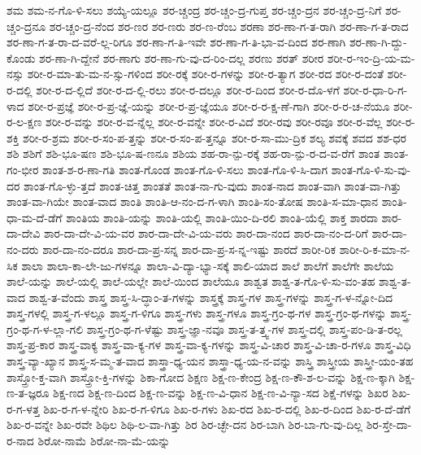 {ಶಮ
ಶಮ-ನ-ಗೊ-ಳಿ-ಸಲು
ಶಯ್ಯೆ-ಯಲ್ಲೂ
ಶರ-ಚ್ಚಂದ್ರ
ಶರ-ಚ್ಚಂ-ದ್ರ-ಗುಪ್ತ
ಶರ-ಚ್ಚಂ-ದ್ರನ
ಶರ-ಚ್ಚಂ-ದ್ರ-ನಿಗೆ
ಶರ-ಚ್ಚಂ-ದ್ರನೂ
ಶರ-ಚ್ಚಂ-ದ್ರ-ನೆಂದ
ಶರ-ಣರ
ಶರ-ಣರು
ಶರ-ಣ-ರೆಂಬ
ಶರಣಾ
ಶರ-ಣಾ-ಗ-ತ-ರಾಗಿ
ಶರ-ಣಾ-ಗ-ತ-ರಾದ
ಶರ-ಣಾ-ಗ-ತ-ರಾ-ದ-ವರೆ-ಲ್ಲ-ರಿಗೂ
ಶರ-ಣಾ-ಗ-ತಿ-ಇವೇ
ಶರ-ಣಾ-ಗ-ತಿ-ಭಾ-ವ-ದಿಂದ
ಶರ-ಣಾಗಿ
ಶರ-ಣಾ-ಗಿ-ದ್ದು-ಕೊಂಡು
ಶರ-ಣಾ-ಗಿ-ದ್ದೇನೆ
ಶರ-ಣಾಗು
ಶರ-ಣಾ-ಗು-ವು-ದ-ರಿಂ-ದಲ್ಲ
ಶರಣು
ಶರತ್
ಶರೀರ
ಶರೀ-ರ-ಇಂ-ದ್ರಿ-ಯ-ಮ-ನಸ್ಸು
ಶರೀ-ರ-ಮಾ-ತು-ಮ-ನ-ಸ್ಸು-ಗಳಿಂದ
ಶರೀ-ರಕ್ಕೆ
ಶರೀ-ರ-ಗಳನ್ನು
ಶರೀ-ರ-ತ್ಯಾಗ
ಶರೀ-ರದ
ಶರೀ-ರ-ದಂತೆ
ಶರೀ-ರ-ದಲ್ಲಿ
ಶರೀ-ರ-ದ-ಲ್ಲಿದೆ
ಶರೀ-ರ-ದ-ಲ್ಲಿ-ರಲು
ಶರೀ-ರ-ದಲ್ಲೂ
ಶರೀ-ರ-ದಿಂದ
ಶರೀ-ರ-ದೊ-ಳಗೆ
ಶರೀ-ರ-ಧಾ-ರಿ-ಗ-ಳಾದ
ಶರೀ-ರ-ಪ್ರಜ್ಞೆ
ಶರೀ-ರ-ಪ್ರ-ಜ್ಞೆ-ಯನ್ನು
ಶರೀ-ರ-ಪ್ರ-ಜ್ಞೆಯೂ
ಶರೀ-ರ-ರ-ಕ್ಷ-ಣೆ-ಗಾಗಿ
ಶರೀ-ರ-ರ-ಚ-ನೆಯೂ
ಶರೀ-ರ-ಲ-ಕ್ಷಣ
ಶರೀ-ರ-ವನ್ನು
ಶರೀ-ರ-ವ-ನ್ನೆಲ್ಲ
ಶರೀ-ರ-ವನ್ನೇ
ಶರೀ-ರ-ವಿದೆ
ಶರೀ-ರವು
ಶರೀ-ರವೂ
ಶರೀ-ರ-ವೆಲ್ಲ
ಶರೀ-ರ-ಶಕ್ತಿ
ಶರೀ-ರ-ಶ್ರಮ
ಶರೀ-ರ-ಸಂ-ಪ-ತ್ತನ್ನು
ಶರೀ-ರ-ಸಂ-ಪ-ತ್ತನ್ನೂ
ಶರೀ-ರ-ಸಾ-ಮು-ದ್ರಿಕ
ಶಲ್ಯ
ಶವಕ್ಕೆ
ಶವದ
ಶಶ-ಧರ
ಶಶಿ
ಶಶಿಗೆ
ಶಶಿ-ಭೂ-ಷಣ
ಶಶಿ-ಭೂ-ಷ-ಣನೂ
ಶಶಿಯ
ಶಹ-ರಾ-ನ್ಪು-ರಕ್ಕೆ
ಶಹ-ರಾ-ನ್ಪು-ರ-ದ-ವ-ರೆಗೆ
ಶಾಂತ
ಶಾಂತ-ಗಂ-ಭೀರ
ಶಾಂತ-ಶ-ರ-ಣಾ-ಗತಿ
ಶಾಂತ-ಗೊಂಡ
ಶಾಂತ-ಗೊ-ಳಿ-ಸಲು
ಶಾಂತ-ಗೊ-ಳಿ-ಸಿ-ದಾಗ
ಶಾಂತ-ಗೊ-ಳಿ-ಸು-ವು-ದರ
ಶಾಂತ-ಗೊ-ಳ್ಳು-ತ್ತದೆ
ಶಾಂತ-ಚಿತ್ತ
ಶಾಂತತೆ
ಶಾಂತ-ನಾ-ಗು-ವುದು
ಶಾಂತ-ನಾದ
ಶಾಂತ-ವಾಗಿ
ಶಾಂತ-ವಾ-ಗಿತ್ತು
ಶಾಂತ-ವಾ-ಗಿಯೇ
ಶಾಂತ-ವಾದ
ಶಾಂತಿ
ಶಾಂತಿ-ಆ-ನಂ-ದ-ಗ-ಳಾಗಿ
ಶಾಂತಿ-ಸಂ-ತೋಷ
ಶಾಂತಿ-ಸ-ಮಾ-ಧಾನ
ಶಾಂತಿ-ಧಾ-ಮ-ದೆ-ಡೆಗೆ
ಶಾಂತಿಯ
ಶಾಂತಿ-ಯನ್ನು
ಶಾಂತಿ-ಯಲ್ಲಿ
ಶಾಂತಿ-ಯಿಂ-ದಿ-ರಲಿ
ಶಾಂತಿ-ಯೆಲ್ಲಿ
ಶಾಕ್ತ
ಶಾರದಾ
ಶಾರ-ದಾ-ದೇವಿ
ಶಾರ-ದಾ-ದೇ-ವಿ-ಯ-ವರ
ಶಾರ-ದಾ-ದೇ-ವಿ-ಯ-ವರು
ಶಾರ-ದಾ-ನಂದ
ಶಾರ-ದಾ-ನಂ-ದ-ರಿಗೆ
ಶಾರ-ದಾ-ನಂ-ದರು
ಶಾರ-ದಾ-ನಂ-ದರೂ
ಶಾರ-ದಾ-ಪ್ರ-ಸನ್ನ
ಶಾರ-ದಾ-ಪ್ರ-ಸ-ನ್ನ-ಇಷ್ಟು
ಶಾರದೆ
ಶಾರೀ-ರಿಕ
ಶಾರೀ-ರಿ-ಕ-ಮಾ-ನ-ಸಿಕ
ಶಾಲಾ
ಶಾಲಾ-ಕಾ-ಲೇ-ಜು-ಗಳನ್ನೂ
ಶಾಲಾ-ವಿ-ದ್ಯಾ-ಭ್ಯಾ-ಸಕ್ಕೆ
ಶಾಲಿ-ಯಾದ
ಶಾಲೆ
ಶಾಲೆಗೆ
ಶಾಲೆಗೇ
ಶಾಲೆಯ
ಶಾಲೆ-ಯನ್ನು
ಶಾಲೆ-ಯಲ್ಲಿ
ಶಾಲೆ-ಯಲ್ಲೇ
ಶಾಲೆ-ಯಿಂದ
ಶಾಲೆಯೂ
ಶಾಶ್ವತ
ಶಾಶ್ವ-ತ-ಗೊ-ಳಿ-ಸು-ವಂ-ತಹ
ಶಾಶ್ವ-ತ-ವಾದ
ಶಾಶ್ವ-ತ-ವೆಂದು
ಶಾಸ್ತ್ರ
ಶಾಸ್ತ್ರ-ಸಿ-ದ್ಧಾಂ-ತ-ಗಳನ್ನು
ಶಾಸ್ತ್ರಕ್ಕೆ
ಶಾಸ್ತ್ರ-ಗಳ
ಶಾಸ್ತ್ರ-ಗಳನ್ನು
ಶಾಸ್ತ್ರ-ಗ-ಳ-ನ್ನೋ-ದಿದ
ಶಾಸ್ತ್ರ-ಗಳಲ್ಲಿ
ಶಾಸ್ತ್ರ-ಗ-ಳಲ್ಲೂ
ಶಾಸ್ತ್ರ-ಗ-ಳಿಗೂ
ಶಾಸ್ತ್ರ-ಗಳು
ಶಾಸ್ತ್ರ-ಗಳೂ
ಶಾಸ್ತ್ರ-ಗ್ರಂ-ಥ-ಗಳ
ಶಾಸ್ತ್ರ-ಗ್ರಂ-ಥ-ಗಳನ್ನು
ಶಾಸ್ತ್ರ-ಗ್ರಂ-ಥ-ಗ-ಳ-ಲ್ಲಾ-ಗಲಿ
ಶಾಸ್ತ್ರ-ಗ್ರಂ-ಥ-ಗ-ಳೆಷ್ಟು
ಶಾಸ್ತ್ರ-ಜ್ಞಾ-ನವೂ
ಶಾಸ್ತ್ರ-ತ-ತ್ತ್ವ-ಗಳ
ಶಾಸ್ತ್ರ-ದಲ್ಲಿ
ಶಾಸ್ತ್ರ-ಪಂ-ಡಿ-ತ-ರಲ್ಲ
ಶಾಸ್ತ್ರ-ಪ್ರ-ಕಾರ
ಶಾಸ್ತ್ರ-ವಾಕ್ಯ
ಶಾಸ್ತ್ರ-ವಾ-ಕ್ಯ-ಗಳ
ಶಾಸ್ತ್ರ-ವಾ-ಕ್ಯ-ಗಳನ್ನು
ಶಾಸ್ತ್ರ-ವಿ-ಚಾರ
ಶಾಸ್ತ್ರ-ವಿ-ಚಾ-ರ-ಗಳೂ
ಶಾಸ್ತ್ರ-ವಿಧಿ
ಶಾಸ್ತ್ರ-ವ್ಯಾ-ಖ್ಯಾನ
ಶಾಸ್ತ್ರ-ಸ-ಮ್ಮ-ತ-ವಾದ
ಶಾಸ್ತ್ರಾ-ಧ್ಯ-ಯನ
ಶಾಸ್ತ್ರಾ-ಧ್ಯ-ಯ-ನ-ವನ್ನು
ಶಾಸ್ತ್ರಿ
ಶಾಸ್ತ್ರೀಯ
ಶಾಸ್ತ್ರೀ-ಯಂ-ತಹ
ಶಾಸ್ತ್ರೋ-ಕ್ತ-ವಾಗಿ
ಶಾಸ್ತ್ರೋ-ಕ್ತಿ-ಗಳನ್ನು
ಶಿಕಾ-ಗೋದ
ಶಿಕ್ಷಣ
ಶಿಕ್ಷ-ಣ-ಕೇಂದ್ರ
ಶಿಕ್ಷ-ಣ-ಕೌ-ಶ-ಲ-ವನ್ನು
ಶಿಕ್ಷ-ಣ-ಕ್ಕಾಗಿ
ಶಿಕ್ಷ-ಣ-ತ-ಜ್ಞರೂ
ಶಿಕ್ಷ-ಣದ
ಶಿಕ್ಷ-ಣ-ದಿಂದ
ಶಿಕ್ಷ-ಣ-ವನ್ನು
ಶಿಕ್ಷ-ಣ-ವಿ-ಧಾನ
ಶಿಕ್ಷ-ಣ-ವಿ-ನ್ಯಾ-ಸದ
ಶಿಕ್ಷೆ-ಗಳನ್ನು
ಶಿಖರ
ಶಿಖ-ರ-ಗ-ಳತ್ತ
ಶಿಖ-ರ-ಗ-ಳ-ನ್ನೇರಿ
ಶಿಖ-ರ-ಗ-ಳಿಗೂ
ಶಿಖ-ರ-ಗಳು
ಶಿಖ-ರದ
ಶಿಖ-ರ-ದಲ್ಲಿ
ಶಿಖ-ರ-ದಿಂದ
ಶಿಖ-ರ-ದೆ-ಡೆಗೆ
ಶಿಖ-ರ-ವನ್ನೇ
ಶಿಖ-ರವೇ
ಶಿಥಿಲ
ಶಿಥಿ-ಲ-ವಾ-ಗಿತ್ತು
ಶಿರ
ಶಿರ-ಚ್ಛೇ-ದನ
ಶಿರ-ಬಾಗಿ
ಶಿರ-ಬಾ-ಗು-ವು-ದಿಲ್ಲ
ಶಿರ-ಸ್ತೇ-ದಾ-ರ-ನಾದ
ಶಿರೋ-ನಾಮೆ
ಶಿರೋ-ನಾ-ಮೆ-ಯನ್ನು
}
